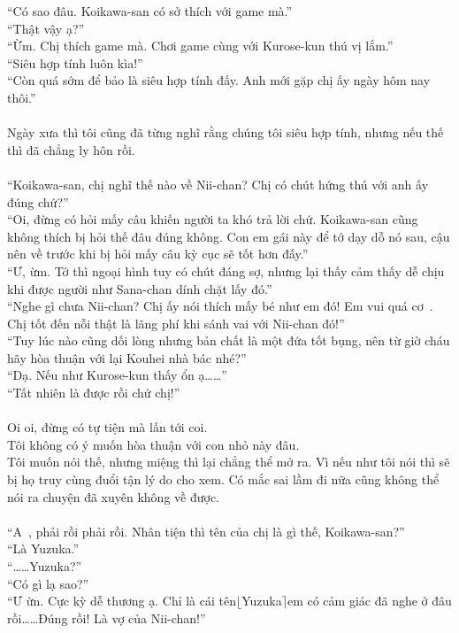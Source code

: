 \documentclass[12pt,a4paper, twosides]{book}
\begin{document}
“Có sao đâu. Koikawa-san có sở thích với game mà.”\\
“Thật vậy ạ?”\\
“Ừm. Chị thích game mà. Chơi game cùng với Kurose-kun thú vị lắm.”\\
“Siêu hợp tính luôn kìa!”\\
“Còn quá sớm để bảo là siêu hợp tính đấy. Anh mới gặp chị ấy ngày hôm nay thôi.”\\
\\
Ngày xưa thì tôi cũng đã từng nghĩ rằng chúng tôi siêu hợp tính, nhưng nếu thế thì đã chẳng ly hôn rồi.\\
\\
“Koikawa-san, chị nghĩ thế nào về Nii-chan? Chị có chút hứng thú với anh ấy đúng chứ?”\\
“Oi, đừng có hỏi mấy câu khiến người ta khó trả lời chứ. Koikawa-san cũng không thích bị hỏi thế đâu đúng không. Con em gái này để tớ dạy dỗ nó sau, cậu nên về trước khi bị hỏi mấy câu kỳ cục sẽ tốt hơn đấy.”\\
“Ư, ừm. Tớ thì ngoại hình tuy có chút đáng sợ, nhưng lại thấy cảm thấy dễ chịu khi được người như Sana-chan dính chặt lấy đó.”\\
“Nghe gì chưa Nii-chan? Chị ấy nói thích mấy bé như em đó! Em vui quá cơ~. Chị tốt đến nỗi thật là lãng phí khi sánh vai với Nii-chan đó!”\\
“Tuy lúc nào cũng dối lòng nhưng bản chất là một đứa tốt bụng, nên từ giờ cháu hãy hòa thuận với lại Kouhei nhà bác nhé?”\\
“Dạ. Nếu như Kurose-kun thấy ổn ạ……”\\
“Tất nhiên là được rồi chứ chị!”\\
\\
Oi oi, đừng có tự tiện mà lấn tới coi.\\
Tôi không có ý muốn hòa thuận với con nhỏ này đâu.\\
Tôi muốn nói thế, nhưng miệng thì lại chẳng thể mở ra. Vì nếu như tôi nói thì sẽ bị họ truy cùng đuổi tận lý do cho xem. Có mắc sai lầm đi nữa cũng không thể nói ra chuyện đã xuyên không về được.\\
\\
“A~, phải rồi phải rồi. Nhân tiện thì tên của chị là gì thế, Koikawa-san?”\\
“Là Yuzuka.”\\
“……Yuzuka?”\\
“Có gì lạ sao?”\\
“Ư ừn. Cực kỳ dễ thương ạ. Chỉ là cái tên$\lfloor$Yuzuka$\rceil$em có cảm giác đã nghe ở đâu rồi……Đúng rồi! Là vợ của Nii-chan!”\\
\end{document}
